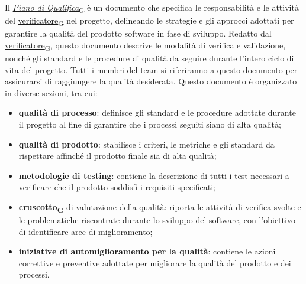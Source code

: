 Il \href{https://7last.github.io/docs/rtb/documentazione-interna/glossario\#piano-di-qualifica}{\textit{Piano di Qualifica}\textsubscript{G}} è un documento che specifica le responsabilità e le attività del \href{https://7last.github.io/docs/rtb/documentazione-interna/glossario\#verificatore}{verificatore\textsubscript{G}} nel progetto, delineando le strategie e gli approcci adottati per garantire la qualità del prodotto software in fase di sviluppo. Redatto dal \href{https://7last.github.io/docs/rtb/documentazione-interna/glossario\#verificatore}{verificatore\textsubscript{G}}, questo documento descrive le modalità di verifica e validazione, nonché gli standard e le procedure di qualità da seguire durante l'intero ciclo di vita del progetto. Tutti i membri del team si riferiranno a questo documento per assicurarsi di raggiungere la qualità desiderata. Questo documento è organizzato in diverse sezioni, tra cui:
\begin{itemize}
	\item \textbf{qualità di processo}: definisce gli standard e le procedure adottate durante il progetto al fine di garantire che i processi seguiti siano di alta qualità;
	\item \textbf{qualità di prodotto}: stabilisce i criteri, le metriche e gli standard da rispettare affinché il prodotto finale sia di alta qualità;
	\item \textbf{metodologie di testing}: contiene la descrizione di tutti i test necessari a verificare che il prodotto soddisfi i requisiti specificati;
	\item \href{https://7last.github.io/docs/rtb/documentazione-interna/glossario\#cruscotto}{\textbf{cruscotto\textsubscript{G}} di valutazione della qualità}: riporta le attività di verifica svolte e le problematiche riscontrate durante lo sviluppo del software, con l'obiettivo di identificare aree di miglioramento;
	\item \textbf{iniziative di automiglioramento per la qualità}: contiene le azioni correttive e preventive adottate per migliorare la qualità del prodotto e dei processi.
\end{itemize}

